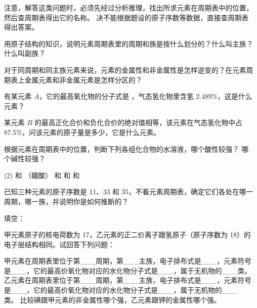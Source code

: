 注意，解答这类问题时，必须先经过分析推理，找出所求元素在周期表中的位置，然后查周期表得出它的名称。
决不能根据题设的原子序数等数据，直接查周期表得出答案。

\begin{Practice}[习题]
  \begin{question}
    \item 用原子结构的知识，说明元素周期表里的周期和族是按什么划分的？什么叫主族？什么叫副族？
    \item 对于同周期和同主族元素来说，元素的金属性和非金属性是怎样逆变的？在元素周期表上金属元素和非金属元素是怎样分区的？
    \item 有某元素 $A$，它的最高氧化物的分子式是 ，气态氢化物里含氢 2.489\%，这是什么元素？
    \item 某元素 $B$ 的最高正化合价和负化合价的绝对值相等，该元素在气态氢化物中占 87.5\%，问该元素的原子量是多少，它是什么元素。
    \item 根据元素在周期表中的位置，判断下列各组化合物的水溶液，哪个酸性较强？ 哪个碱性较强？
    \begin{tasks}(2)
      \task {} 和 （硼酸）
      \task {} 和 
      \task {} 和 
      \task {} 和 
    \end{tasks}
    \item 已知三种元素的原子序数是 11、33 和 35，不看元素周期表，确定它们各处在哪一周期，哪一族，并说明你是如何推断的？
    \item 填空：
    
    \item 甲元素原子的核电荷数为 17，乙元素的正二价离子跟氢原子（原子序数为 18）的电子层结构相同。试回答下列问题：
    \begin{tasks}
      \task 甲元素在周期表里位于第\_\_\_周期，第\_\_\_主族，电子排布式是\_\_\_，元素符号是\_\_\_，它的最高价氧化物对应的水化物分子式是\_\_\_，属于无机物的\_\_\_类。
      \task 乙元素在周期表里位于第\_\_\_周期，第\_\_\_主族，电子排布式是\_\_\_，元素符号是\_\_\_，它的最高价氧化物对应的水化物分子式是\_\_\_，属于无机物的\_\_\_ 类。
      \task 比较碘跟甲元素的非金属性哪个强，乙元素跟钾的金属性哪个强。
    \end{tasks}
  \end{question}
\end{Practice}

